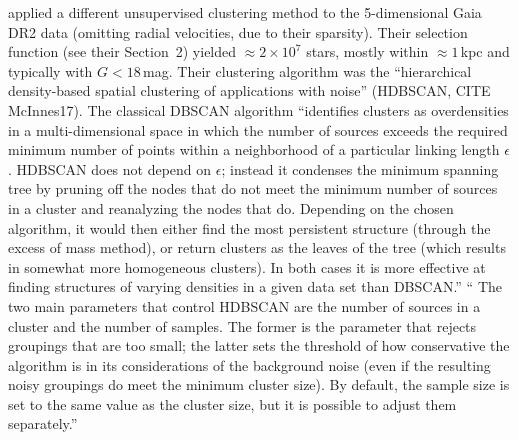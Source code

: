 \documentclass[12pt,twocolumn,tighten]{aastex63}
\begin{document}
\citet{kounkel_untangling_2019} applied a different unsupervised
clustering method to the 5-dimensional Gaia DR2 data (omitting radial
velocities, due to their sparsity).  Their selection function (see
their Section~2) yielded $\approx 2\times 10^7$ stars, mostly within
$\approx 1$\,kpc and typically with $G<18$\,mag.  Their clustering
algorithm was the ``hierarchical density-based spatial clustering of
applications with noise'' (HDBSCAN, CITE McInnes17).  The classical
DBSCAN algorithm ``identifies clusters as overdensities in a
multi-dimensional space in which the number of sources exceeds the
required minimum number of points within a neighborhood of a
particular linking length $\epsilon$.  HDBSCAN does not depend on
$\epsilon$; instead it condenses the minimum spanning tree by pruning
off the nodes that do not meet the minimum number of sources in a
cluster and reanalyzing the nodes that do. Depending on the chosen
algorithm, it would then either find the most persistent structure
(through the excess of mass method), or return clusters as the leaves
of the tree (which results in somewhat more homogeneous clusters). In
both cases it is more effective at finding structures of varying
densities in a given data set than DBSCAN.''
`` The two main parameters that control HDBSCAN are the number of
sources in a cluster and the number of samples. The former is the
parameter that rejects groupings that are too small; the latter sets
the threshold of how conservative the algorithm is in its
considerations of the background noise (even if the resulting noisy
groupings do meet the minimum cluster size).  By default, the sample
size is set to the same value as the cluster size, but it is possible
to adjust them separately.''


\listofchanges

\end{document}
